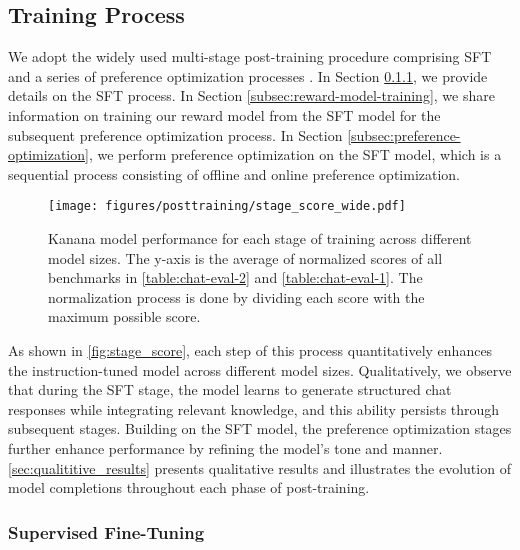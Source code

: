\subsection{Training Process}
\label{subsec:post_train_process}

We adopt the widely used multi-stage post-training procedure comprising SFT and a series of preference optimization processes \citep{ouyang2022instruct, llama3, qwen25techreport, gemma2024gemma2}.
In Section \ref{subsec:post_train_sft}, we provide details on the SFT process.
In Section \ref{subsec:reward-model-training}, we share information on training our reward model from the SFT model for the subsequent preference optimization process.
In Section \ref{subsec:preference-optimization}, we perform preference optimization on the SFT model, which is a sequential process consisting of offline and online preference optimization. 


\begin{figure}[h]
    \centering
    \texttt{[image: figures/posttraining/stage\_score\_wide.pdf]}
    \caption{
    Kanana model performance for each stage of training across different model sizes.
    The y-axis is the average of normalized scores of all benchmarks in \autoref{table:chat-eval-2} and \autoref{table:chat-eval-1}.
    The normalization process is done by dividing each score with the maximum possible score.
    }
    \label{fig:stage_score}
\end{figure}

As shown in \autoref{fig:stage_score}, each step of this process quantitatively enhances the instruction-tuned model across different model sizes.
Qualitatively, we observe that during the SFT stage, the model learns to generate structured chat responses while integrating relevant knowledge, and this ability persists through subsequent stages.
Building on the SFT model, the preference optimization stages further enhance performance by refining the model’s tone and manner.
\autoref{sec:qualititive_results} presents qualitative results and illustrates the evolution of model completions throughout each phase of post-training.



\subsubsection{Supervised Fine-Tuning}
\label{subsec:post_train_sft}


